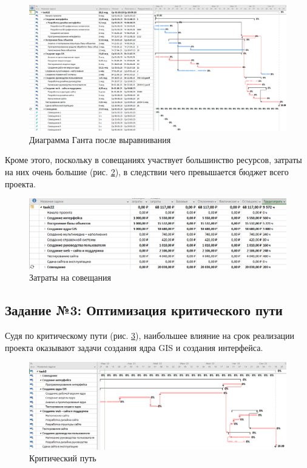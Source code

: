 \begin{figure}[!h]
	\centering
	\includegraphics[width=1\linewidth]{inc/img/5.png}
	\caption{Диаграмма Ганта после выравнивания}
	\label{p5}
\end{figure}
\newpage
Кроме этого, поскольку в совещаниях участвует большинство ресурсов, затраты на них очень большие (рис. \ref{p6}), в следствии чего превышается бюджет всего проекта.

\begin{figure}[!h]
	\centering
	\includegraphics[width=1\linewidth]{inc/img/6.png}
	\caption{Затраты на совещания}
	\label{p6}
\end{figure}

\subsection*{Задание №3: Оптимизация критического пути}

Судя по критическому пути (рис. \ref{p7}), наибольшее влияние на срок реализации проекта оказывают задачи создания ядра GIS и создания интерфейса.

\begin{figure}[!h]
	\centering
	\includegraphics[width=1\linewidth]{inc/img/7.png}
	\caption{Критический путь}
	\label{p7}
\end{figure}

